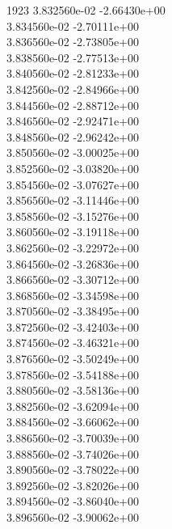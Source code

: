 1923	3.832560e-02	-2.66430e+00	\\ 	3.834560e-02	-2.70111e+00	\\ 	3.836560e-02	-2.73805e+00	\\ 	3.838560e-02	-2.77513e+00	\\ 	3.840560e-02	-2.81233e+00	\\ 	3.842560e-02	-2.84966e+00	\\ 	3.844560e-02	-2.88712e+00	\\ 	3.846560e-02	-2.92471e+00	\\ 	3.848560e-02	-2.96242e+00	\\ 	3.850560e-02	-3.00025e+00	\\ 	3.852560e-02	-3.03820e+00	\\ 	3.854560e-02	-3.07627e+00	\\ 	3.856560e-02	-3.11446e+00	\\ 	3.858560e-02	-3.15276e+00	\\ 	3.860560e-02	-3.19118e+00	\\ 	3.862560e-02	-3.22972e+00	\\ 	3.864560e-02	-3.26836e+00	\\ 	3.866560e-02	-3.30712e+00	\\ 	3.868560e-02	-3.34598e+00	\\ 	3.870560e-02	-3.38495e+00	\\ 	3.872560e-02	-3.42403e+00	\\ 	3.874560e-02	-3.46321e+00	\\ 	3.876560e-02	-3.50249e+00	\\ 	3.878560e-02	-3.54188e+00	\\ 	3.880560e-02	-3.58136e+00	\\ 	3.882560e-02	-3.62094e+00	\\ 	3.884560e-02	-3.66062e+00	\\ 	3.886560e-02	-3.70039e+00	\\ 	3.888560e-02	-3.74026e+00	\\ 	3.890560e-02	-3.78022e+00	\\ 	3.892560e-02	-3.82026e+00	\\ 	3.894560e-02	-3.86040e+00	\\ 	3.896560e-02	-3.90062e+00	\\ \hline
